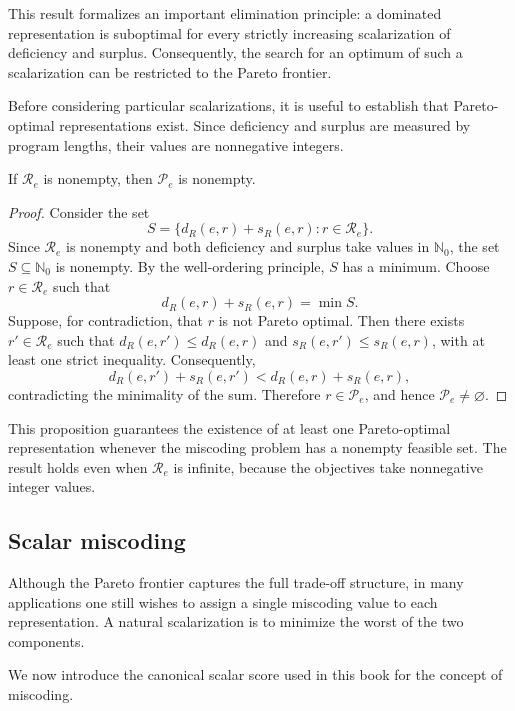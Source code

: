 This result formalizes an important elimination principle: a dominated representation is suboptimal for every strictly increasing scalarization of deficiency and surplus. Consequently, the search for an optimum of such a scalarization can be restricted to the Pareto frontier.

Before considering particular scalarizations, it is useful to establish that Pareto-optimal representations exist. Since deficiency and surplus are measured by program lengths, their values are nonnegative integers.

\begin{proposition}
\label{prop:pareto_nonempty_finite}
If $\mathcal R_e$ is nonempty, then $\mathcal P_e$ is nonempty.
\end{proposition}
\begin{proof}
Consider the set
\[
S = \bigl\{d_R(e,r)+s_R(e,r): r\in\mathcal R_e \bigr\}.
\]
Since $\mathcal R_e$ is nonempty and both deficiency and surplus take values in $\mathbb N_0$, the set $S\subseteq\mathbb N_0$ is nonempty. By the well-ordering principle, $S$ has a minimum. Choose $r\in\mathcal R_e$ such that
\[
d_R(e,r)+s_R(e,r)=\min S.
\]
Suppose, for contradiction, that $r$ is not Pareto optimal. Then there exists $r'\in\mathcal R_e$
such that $d_R(e,r')\le d_R(e,r)$ and $s_R(e,r')\le s_R(e,r)$, with at least one strict inequality. Consequently,
\[
d_R(e,r')+s_R(e,r') < d_R(e,r)+s_R(e,r),
\]
contradicting the minimality of the sum. Therefore $r\in\mathcal P_e$, and hence $\mathcal P_e\neq\varnothing$.
\end{proof}

This proposition guarantees the existence of at least one Pareto-optimal representation whenever the miscoding problem has a nonempty feasible set. The result holds even when $\mathcal R_e$ is infinite, because the objectives take nonnegative integer values.


\subsection*{Scalar miscoding}

Although the Pareto frontier captures the full trade-off structure, in many applications one still wishes to assign a single miscoding value to each representation. A natural scalarization is to minimize the worst of the two components.

We now introduce the canonical scalar score used in this book for the concept of miscoding.

